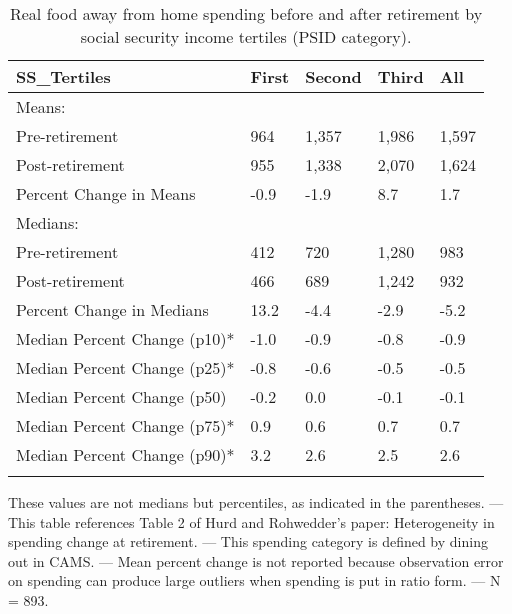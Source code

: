 \begin{table}[tbp] \centering
{}

\caption{Real food away from home spending before and after retirement by social security income tertiles (PSID category).}
\begin{tabularx}{\textwidth}{lCCCC}

\toprule
{SS\_Tertiles}&{First}&{Second}&{Third}&{All} \tabularnewline
\midrule\addlinespace[1.5ex]
Means:&&&& \tabularnewline
\midrule Pre-retirement&964&1,357&1,986&1,597 \tabularnewline
Post-retirement&955&1,338&2,070&1,624 \tabularnewline
Percent Change in Means&-0.9&-1.9&8.7&1.7 \tabularnewline
\midrule Medians:&&&& \tabularnewline
\midrule Pre-retirement&412&720&1,280&983 \tabularnewline
Post-retirement&466&689&1,242&932 \tabularnewline
Percent Change in Medians&13.2&-4.4&-2.9&-5.2 \tabularnewline
Median Percent Change (p10)*&-1.0&-0.9&-0.8&-0.9 \tabularnewline
Median Percent Change (p25)*&-0.8&-0.6&-0.5&-0.5 \tabularnewline
Median Percent Change (p50)&-0.2&0.0&-0.1&-0.1 \tabularnewline
Median Percent Change (p75)*&0.9&0.6&0.7&0.7 \tabularnewline
Median Percent Change (p90)*&3.2&2.6&2.5&2.6 \tabularnewline
\bottomrule \addlinespace[1.5ex]

\end{tabularx}
\begin{flushleft}
\footnotesize *These values are not medians but percentiles, as indicated in the parentheses. \linebreak --- \linebreak This table references Table 2 of Hurd and Rohwedder's paper: Heterogeneity in spending change at retirement. \linebreak --- \linebreak This spending category is defined by dining out in CAMS. \linebreak --- \linebreak Mean percent change is not reported because observation error on spending can produce large outliers when spending is put in ratio form. \linebreak --- \linebreak N = 893.
\end{flushleft}
\end{table}

